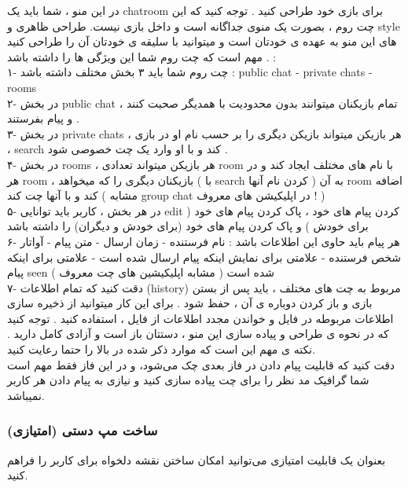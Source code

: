 \documentclass[]{article}
\begin{document}
در این منو ، شما باید یک chatroom برای بازی خود طراحی کنید . توجه کنید که این چت روم ، بصورت یک منوی جداگانه است و داخل بازی نیست. طراحی ظاهری و style های این منو به عهده ی خودتان است و میتوانید با سلیقه ی خودتان آن را طراحی کنید . مهم است که چت روم شما این ویژگی ها را داشته باشد : \\
۱- چت روم شما باید ۳ بخش مختلف داشته باشد : public chat - private chats - rooms\\
۲- در بخش public chat ، تمام بازیکنان میتوانند بدون محدودیت با همدیگر صحبت کنند و پیام بفرستند .\\
۳- در بخش private chats ، هر بازیکن میتواند بازیکن دیگری را بر حسب نام او در بازی ، search کند و با او وارد یک چت خصوصی شود .\\
۴- در بخش rooms ، هر بازیکن میتواند تعدادی room با نام های مختلف ایجاد کند و در هر room ، بازیکنان دیگری را که میخواهد ( با search کردن نام آنها ) به آن room اضافه کند و با آنها چت کند ( مشابه group chat در اپلیکیشن های معروف ! )\\
۵- در هر بخش ، کاربر باید توانایی edit کردن پیام های خود ، پاک کردن پیام های خود ( برای خودش ) و پاک کردن پیام های خود (برای خودش و دیگران) را داشته باشد\\
۶- هر پیام باید حاوی این اطلاعات باشد : نام فرستنده - زمان ارسال - متن پیام - آواتار شخص فرستنده - علامتی برای نمایش اینکه پیام ارسال شده است - علامتی برای اینکه پیام seen شده است ( مشابه اپلیکیشین های چت معروف ) \\
۷- دقت کنید که تمام اطلاعات (history) مربوط به چت های مختلف ، باید پس از بستن بازی و باز کردن دوباره ی آن ، حفظ شود . برای این کار میتوانید از ذخیره سازی اطلاعات مربوطه در فایل و خواندن مجدد اطلاعات از فایل ، استفاده کنید .
توجه کنید که در نحوه ی طراحی و پیاده سازی این منو ، دستتان باز است و آزادی کامل دارید . نکته ی مهم این است که موارد ذکر شده در بالا را حتما رعایت کنید.\\
دقت کنید که قابلیت پیام دادن در فاز بعدی چک می‌شود، و در این فاز فقط مهم است شما گرافیک مد نظر را برای چت پیاده سازی کنید و نیازی به پیام دادن هر کاربر نمیباشد.

\subsubsection*{{\titr ساخت مپ دستی (امتیازی)}}

بعنوان یک قابلیت امتیازی می‌توانید امکان ساختن نقشه دلخواه برای کاربر را فراهم کنید. 
\end{document}
